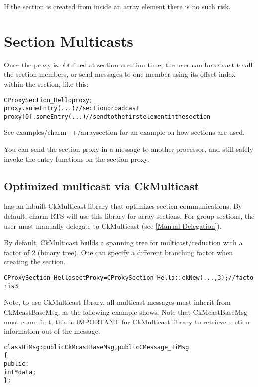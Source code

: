 If the section is created from inside an array element there is no such risk.

\section{Section Multicasts}
\label {array_section_multicast}

Once the proxy is obtained at section creation time, the user can broadcast to all the
section members, or send messages to one member using its offset index within the section, like this:

\begin{alltt}
  CProxySection_Hello proxy;
  proxy.someEntry(...)          // section broadcast
  proxy[0].someEntry(...)       // send to the first element in the section
\end{alltt}

See examples/charm++/arraysection for an example on how sections are used.

You can send the section proxy in a message to another processor, and still
safely invoke the entry functions on the section proxy.

\subsection{Optimized multicast via CkMulticast}

\charmpp{} has an inbuilt CkMulticast library that optimizes section communications.
By default, charm RTS will use this library for array sections. For group sections,
the user must manually delegate to CkMulticast (see \ref{Manual Delegation}).

By default, CkMulticast builds a spanning tree for multicast/reduction
with a factor of 2 (binary tree). One can specify a different branching factor when creating the
section.
\begin{alltt}
  CProxySection_Hello sectProxy = CProxySection_Hello::ckNew(..., 3); // factor is 3
\end{alltt}

Note, to use CkMulticast library, all multicast messages must inherit from
CkMcastBaseMsg, as the following example shows.
Note that CkMcastBaseMsg must come first, this is IMPORTANT for CkMulticast
library to retrieve section information out of the message.


\begin{alltt}
class HiMsg : public CkMcastBaseMsg, public CMessage_HiMsg
\{
public:
  int *data;
\};
\end{alltt}

